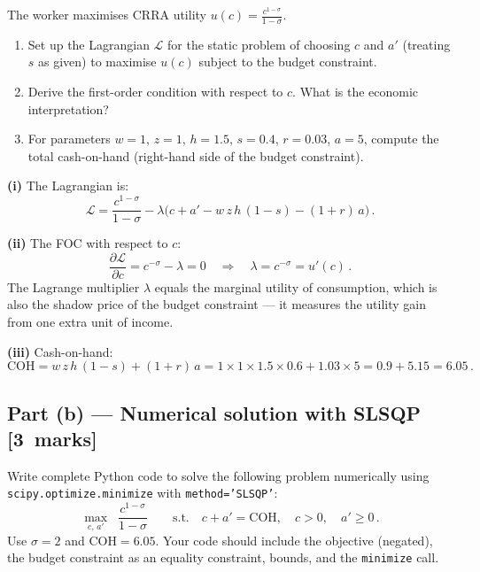 \documentclass[11pt,a4paper]{article}
\newcommand{\mkpts}[1]{\hfill\textbf{[#1~marks]}}
\begin{document}
The worker maximises CRRA utility $u(c) = \frac{c^{1-\sigma}}{1-\sigma}$.

\begin{enumerate}[label=(\roman*),nosep]
\item Set up the Lagrangian $\mathcal{L}$ for the static problem of choosing $c$ and $a'$ (treating $s$ as given) to maximise $u(c)$ subject to the budget constraint.
\item Derive the first-order condition with respect to $c$.  What is the economic interpretation?
\item For parameters $w=1$, $z=1$, $h=1.5$, $s=0.4$, $r=0.03$, $a=5$, compute the total cash-on-hand (right-hand side of the budget constraint).
\end{enumerate}

\begin{solution}
\textbf{(i)} The Lagrangian is:
\[
\mathcal{L} = \frac{c^{1-\sigma}}{1-\sigma} - \lambda\bigl(c + a' - w\,z\,h\,(1-s) - (1+r)\,a\bigr)\,.
\]

\textbf{(ii)} The FOC with respect to $c$:
\[
\frac{\partial \mathcal{L}}{\partial c} = c^{-\sigma} - \lambda = 0 \quad\Longrightarrow\quad \lambda = c^{-\sigma} = u'(c)\,.
\]
The Lagrange multiplier $\lambda$ equals the marginal utility of consumption, which is also the shadow price of the budget constraint --- it measures the utility gain from one extra unit of income.

\medskip

\textbf{(iii)} Cash-on-hand:
\[
\text{COH} = w\,z\,h\,(1-s) + (1+r)\,a = 1 \times 1 \times 1.5 \times 0.6 + 1.03 \times 5 = 0.9 + 5.15 = \boxed{6.05}\,.
\]
\end{solution}

\subsection*{Part (b) --- Numerical solution with SLSQP \mkpts{3}}

Write complete Python code to solve the following problem numerically using \texttt{scipy.optimize.minimize} with \texttt{method='SLSQP'}:
\[
\max_{c,\,a'} \;\; \frac{c^{1-\sigma}}{1-\sigma} \qquad \text{s.t.} \quad c + a' = \text{COH}, \quad c > 0, \quad a' \ge 0\,.
\]
Use $\sigma = 2$ and $\text{COH} = 6.05$.  Your code should include the objective (negated), the budget constraint as an equality constraint, bounds, and the \texttt{minimize} call.
\end{document}
